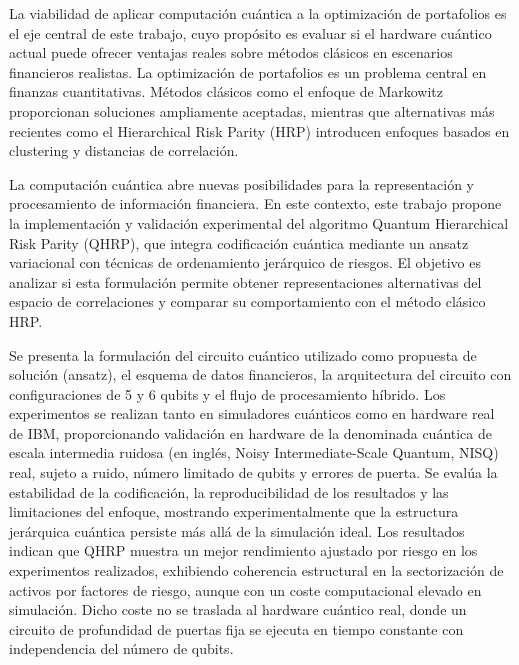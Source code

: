 La viabilidad de aplicar computación cuántica a la optimización de portafolios es el eje central de este trabajo, cuyo propósito es evaluar si el hardware cuántico actual puede ofrecer ventajas reales sobre métodos clásicos en escenarios financieros realistas. La optimización de portafolios es un problema central en finanzas cuantitativas. Métodos clásicos como el enfoque de Markowitz proporcionan soluciones ampliamente aceptadas, mientras que alternativas más recientes como el Hierarchical Risk Parity (HRP) introducen enfoques basados en clustering y distancias de correlación.

La computación cuántica abre nuevas posibilidades para la representación y procesamiento de información financiera. En este contexto, este trabajo propone la implementación y validación experimental del algoritmo Quantum Hierarchical Risk Parity (QHRP), que integra codificación cuántica mediante un ansatz variacional con técnicas de ordenamiento jerárquico de riesgos. El objetivo es analizar si esta formulación permite obtener representaciones alternativas del espacio de correlaciones y comparar su comportamiento con el método clásico HRP.

Se presenta la formulación del circuito cuántico utilizado como propuesta de solución (ansatz), el esquema de datos financieros, la arquitectura del circuito con configuraciones de 5 y 6 qubits y el flujo de procesamiento híbrido. Los experimentos se realizan tanto en simuladores cuánticos como en hardware real de IBM, proporcionando validación en hardware de la denominada cuántica de escala intermedia ruidosa (en inglés, Noisy Intermediate-Scale Quantum, NISQ) real, sujeto a ruido, número limitado de qubits y errores de puerta. Se evalúa la estabilidad de la codificación, la reproducibilidad de los resultados y las limitaciones del enfoque, mostrando experimentalmente que la estructura jerárquica cuántica persiste más allá de la simulación ideal. Los resultados indican que QHRP muestra un mejor rendimiento ajustado por riesgo en los experimentos realizados, exhibiendo coherencia estructural en la sectorización de activos por factores de riesgo, aunque con un coste computacional elevado en simulación. Dicho coste no se traslada al hardware cuántico real, donde un circuito de profundidad de puertas fija se ejecuta en tiempo constante con independencia del número de qubits.

